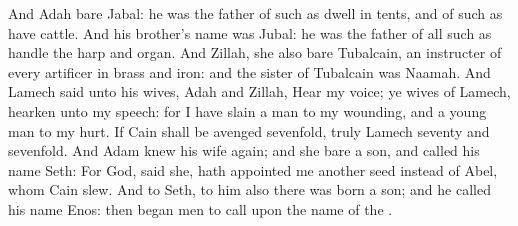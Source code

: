 \begin{biblechapter}
\verse And Adah bare Jabal: he was the father of such as dwell in tents, and of such as have cattle.
\verse And his brother's name was Jubal: he was the father of all such as handle the harp and organ.
\verse And Zillah, she also bare Tubalcain, an instructer of every artificer in brass and iron: and the sister of Tubalcain was Naamah.
\verse And Lamech said unto his wives, Adah and Zillah, Hear my voice; ye wives of Lamech, hearken unto my speech: for I have slain a man to my wounding, and a young man to my hurt.
\verse If Cain shall be avenged sevenfold, truly Lamech seventy and sevenfold.
\verse And Adam knew his wife again; and she bare a son, and called his name Seth: For God, said she, hath appointed me another seed instead of Abel, whom Cain slew.
\verse And to Seth, to him also there was born a son; and he called his name Enos: then began men to call upon the name of the \LORD.
\end{biblechapter}

